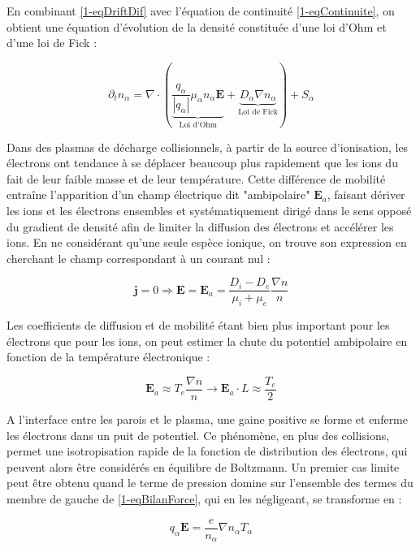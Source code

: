 \begin{refsection}
En combinant \eqref{1-eqDriftDif} avec l'équation de continuité
\eqref{1-eqContinuite}, on obtient une équation d'évolution de la densité
constituée d'une loi d'Ohm et d'une loi de Fick :
 
\begin{equation}
\label{1-eqDriftDifContinuite}
\partial_t
n_\alpha=\nabla\cdot(\underbrace{\frac{q_\alpha}{|q_\alpha|}\mu_\alpha n_\alpha\mathbf E}_\text{Loi d'Ohm}+\underbrace{D_\alpha{\nabla n_\alpha}}_\text{Loi
de Fick})+S_\alpha
\end{equation}

Dans des plasmas de décharge collisionnels, à partir de la source d'ionisation,
les électrons ont tendance à se déplacer beaucoup plus rapidement que les ions
du fait de leur faible masse et de leur température. Cette différence de
mobilité entraîne l'apparition d'un champ électrique dit "ambipolaire"
$\mathbf E_a$, faisant dériver les ions et les électrons ensembles et
systématiquement dirigé dans le sens opposé du gradient de densité afin de
limiter la diffusion des électrons et accélérer les ions. En ne considérant
qu'une seule espèce ionique, on trouve son expression en cherchant le champ
correspondant à un courant nul :
 
\begin{equation}
\label{1-eqEAmb}
\mathbf j=0 \Rightarrow \mathbf E=\mathbf
E_a=\frac{D_i-D_e}{\mu_i+\mu_e}\frac{\nabla
n}{n}
\end{equation}

Les coefficients de diffusion et de mobilité étant bien plus important pour les
électrons que pour les ions, on peut estimer la chute du potentiel ambipolaire
en fonction de la température électronique :

\begin{equation}
\label{1-eqApproxEAmb}
\mathbf E_a\approx T_e\frac{\nabla
n}{n}\rightarrow\mathbf E_a\cdot L\approx\frac{T_e}{2}
\end{equation}

A l'interface entre les parois et le plasma, une gaine positive se
forme et enferme les électrons dans un puit de potentiel. Ce phénomène, en plus
des collisions, permet une isotropisation rapide de la fonction de distribution
des électrons, qui peuvent alors être considérés en équilibre de Boltzmann.
Un premier cas limite peut être obtenu quand le terme de pression domine
sur l'ensemble des termes du membre de gauche de \eqref{1-eqBilanForce}, qui en
les négligeant, se transforme en :

\begin{equation}
\label{1-equilibreBoltzman}
q_\alpha\mathbf
E =\frac{e}{n_\alpha}\nabla n_\alpha T_\alpha
\end{equation}


\end{refsection}
